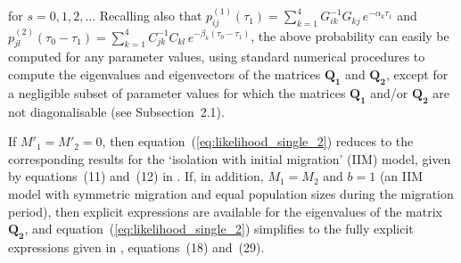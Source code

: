 \documentclass[11pt]{article}
\begin{document}
for $s=0,1,2,\ldots$ Recalling also that $p^{(1)}_{ij}(\tau_1)=\sum_{k=1}^{4} G_{ik}^{-1}G_{kj}\,e^{-\alpha_{k}\tau_1}$  and \\ $p^{(2)}_{jl}(\tau_0-\tau_1)=\sum_{k=1}^{4} C_{jk}^{-1}C_{kl}\,e^{-\beta_{k}(\tau_0-\tau_1)}$, the above probability can easily be computed 
for any parameter values, 
using standard numerical procedures to compute the eigenvalues and eigenvectors of the matrices $\mathbf{Q_{1}}$ and $\mathbf{Q_{2}}$, 
except for a negligible subset of parameter values 
for which the matrices  $\mathbf{Q_{1}}$ and/or $\mathbf{Q_{2}}$ are not diagonalisable (see Subsection~2.1).

If $M'_1=M'_2=0$, then equation~(\ref{eq:likelihood_single_2}) reduces to the corresponding results for the `isolation with initial migration' (IIM) model, given by equations~(11) and~(12) in \citet{Costa2017}. If, in addition, $M_1=M_2$ and $b=1$ (an IIM model with symmetric migration and equal population sizes during the migration period), then explicit expressions are available for the eigenvalues of the matrix $\mathbf{Q_{2}}$, and equation~(\ref{eq:likelihood_single_2}) simplifies to the fully explicit expressions given in \citet{Herbots2012}, equations~(18) and~(29).
\end{document}
